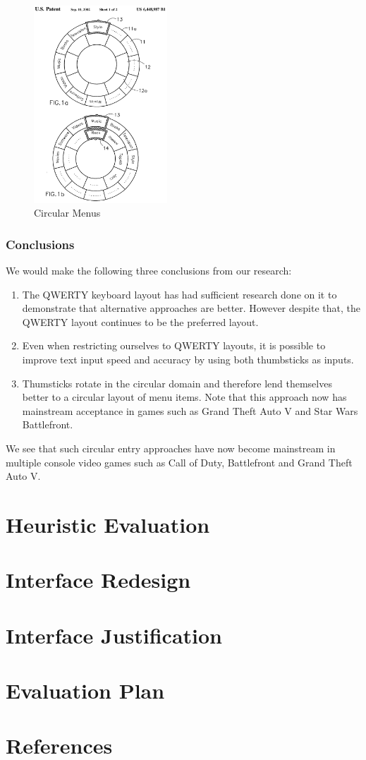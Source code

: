 \documentclass[
	letterpaper, %
]{jdf}
\begin{document}
\begin{figure}[h]
	\centering
	\includegraphics[width=5cm]{jdf-master/Figures/circularmenu.png}
	\caption{Circular Menus}
	\label{fig:circularmanu}
\end{figure}

\subsubsection{Conclusions}
We would make the following three conclusions from our research:
\begin{enumerate}
    \item The QWERTY keyboard layout has had sufficient research done on it to demonstrate that alternative approaches are better. However despite that, the QWERTY layout continues to be the preferred layout.
    \item Even when restricting ourselves to QWERTY layouts, it is possible to improve text input speed and accuracy by using both thumbsticks as inputs.
    \item Thumsticks rotate in the circular domain and therefore lend themselves better to a circular layout of menu items. Note that this approach now has mainstream acceptance in games such as Grand Theft Auto V and Star Wars Battlefront.
\end{enumerate}


We see that such circular entry approaches have now become mainstream in multiple console video games such as Call of Duty, Battlefront and Grand Theft Auto V.



\section{Heuristic Evaluation}

\section{Interface Redesign}

\section{Interface Justification}

\section{Evaluation Plan}


\section{References}

\printbibliography[heading=none]
\end{document}
